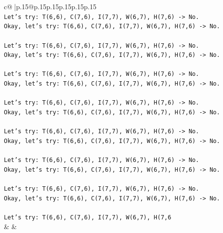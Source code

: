 \documentclass{article}
\begin{document}
{\begin{supertabular}{c@{$\;$}|p{.15\linewidth}@{}p{.15\linewidth}p{.15\linewidth}p{.15\linewidth}p{.15\linewidth}p{.15\linewidth}}
{{{\\ 
\texttt{Let's try: T(6,6), C(7,6), I(7,7), W(6,7), H(7,6) {-}> No.} \\
\texttt{Okay, let's try: T(6,6), C(7,6), I(7,7), W(6,7), H(7,6) {-}> No.} \\
\\ 
\texttt{Let's try: T(6,6), C(7,6), I(7,7), W(6,7), H(7,6) {-}> No.} \\
\texttt{Okay, let's try: T(6,6), C(7,6), I(7,7), W(6,7), H(7,6) {-}> No.} \\
\\ 
\texttt{Let's try: T(6,6), C(7,6), I(7,7), W(6,7), H(7,6) {-}> No.} \\
\texttt{Okay, let's try: T(6,6), C(7,6), I(7,7), W(6,7), H(7,6) {-}> No.} \\
\\ 
\texttt{Let's try: T(6,6), C(7,6), I(7,7), W(6,7), H(7,6) {-}> No.} \\
\texttt{Okay, let's try: T(6,6), C(7,6), I(7,7), W(6,7), H(7,6) {-}> No.} \\
\\ 
\texttt{Let's try: T(6,6), C(7,6), I(7,7), W(6,7), H(7,6) {-}> No.} \\
\texttt{Okay, let's try: T(6,6), C(7,6), I(7,7), W(6,7), H(7,6) {-}> No.} \\
\\ 
\texttt{Let's try: T(6,6), C(7,6), I(7,7), W(6,7), H(7,6) {-}> No.} \\
\texttt{Okay, let's try: T(6,6), C(7,6), I(7,7), W(6,7), H(7,6) {-}> No.} \\
\\ 
\texttt{Let's try: T(6,6), C(7,6), I(7,7), W(6,7), H(7,6) {-}> No.} \\
\texttt{Okay, let's try: T(6,6), C(7,6), I(7,7), W(6,7), H(7,6) {-}> No.} \\
\\ 
\texttt{Let's try: T(6,6), C(7,6), I(7,7), W(6,7), H(7,6} \\
            }
        }
    }
    & & \\ \\


\end{supertabular}}
\end{document}
